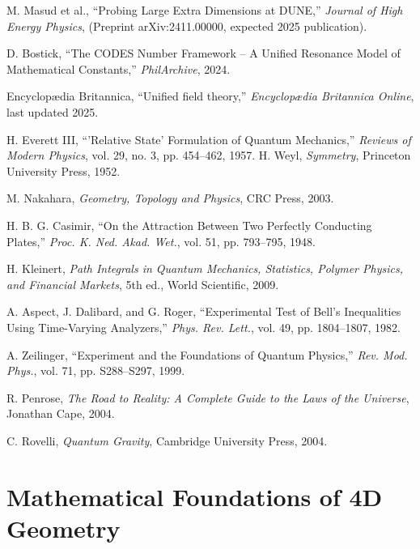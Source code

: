 \documentclass[12pt,a4paper]{article}
\begin{document}
\begin{thebibliography}{99}
M. Masud et al., “Probing Large Extra Dimensions at DUNE,” \emph{Journal of High Energy Physics}, (Preprint arXiv:2411.00000, expected 2025 publication).

D. Bostick, “The CODES Number Framework – A Unified Resonance Model of Mathematical Constants,” \emph{PhilArchive}, 2024.

Encyclopædia Britannica, “Unified field theory,” \emph{Encyclopædia Britannica Online}, last updated 2025.

H. Everett III, “'Relative State' Formulation of Quantum Mechanics,” \emph{Reviews of Modern Physics}, vol. 29, no. 3, pp. 454–462, 1957.
H. Weyl, \emph{Symmetry}, Princeton University Press, 1952.

M. Nakahara, \emph{Geometry, Topology and Physics}, CRC Press, 2003.

H. B. G. Casimir, ``On the Attraction Between Two Perfectly Conducting Plates,'' \emph{Proc. K. Ned. Akad. Wet.}, vol. 51, pp. 793--795, 1948.

H. Kleinert, \emph{Path Integrals in Quantum Mechanics, Statistics, Polymer Physics, and Financial Markets}, 5th ed., World Scientific, 2009.

A. Aspect, J. Dalibard, and G. Roger, ``Experimental Test of Bell's Inequalities Using Time-Varying Analyzers,'' \emph{Phys. Rev. Lett.}, vol. 49, pp. 1804--1807, 1982.

A. Zeilinger, ``Experiment and the Foundations of Quantum Physics,'' \emph{Rev. Mod. Phys.}, vol. 71, pp. S288--S297, 1999.

R. Penrose, \emph{The Road to Reality: A Complete Guide to the Laws of the Universe}, Jonathan Cape, 2004.

C. Rovelli, \emph{Quantum Gravity}, Cambridge University Press, 2004.



\end{thebibliography}

\appendix

\section{Mathematical Foundations of 4D Geometry}
\label{app:4d-geometry}
\end{document}
